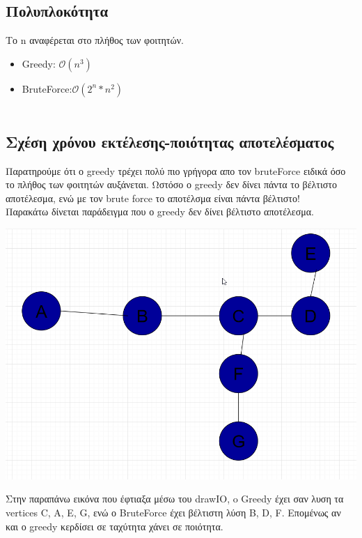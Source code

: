 \documentclass[12pt]{article}
\begin{document}
\subsection{Πολυπλοκότητα}
Το n αναφέρεται στο πλήθος των φοιτητών.
 \begin{itemize}
 	\item Greedy: $\mathcal{O}(n^3)$
 	\item BruteForce:$\mathcal{O}(2^n*n^2)$\\\\
 \end{itemize}

\subsection{Σχέση χρόνου εκτέλεσης-ποιότητας αποτελέσματος}
Παρατηρούμε ότι ο greedy τρέχει πολύ πιο γρήγορα απο τον bruteForce ειδικά όσο το πλήθος των φοιτητών αυξάνεται. Ωστόσο ο greedy δεν δίνει πάντα το βέλτιστο αποτέλεσμα, ενώ με τον brute force το αποτέλσμα είναι πάντα βέλτιστο!\\
Παρακάτω δίνεται παράδειγμα που ο greedy δεν δίνει βέλτιστο αποτέλεσμα.

 \begin{center}
	\includegraphics[scale = 0.7]{GreedyNotBestSolution.png}
\end{center}
Στην παραπάνω εικόνα που έφτιαξα μέσω του drawIO, o Greedy έχει σαν λυση τα vertices {C, A, E, G}, ενώ ο BruteForce έχει βέλτιστη λύση {B, D, F}. Επομένως αν και ο greedy κερδίσει σε ταχύτητα χάνει σε ποιότητα. \\\\
\end{document}
